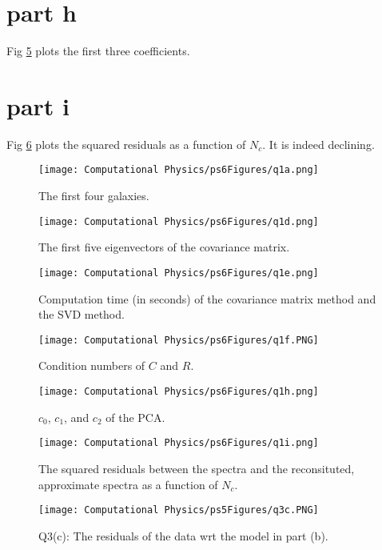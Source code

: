 \documentclass[11pt]{article}
\begin{document}
\section{part h}
Fig \ref{fig:Q1h} plots the first three coefficients.

\section{part i}
Fig \ref{fig:Q1i} plots the squared residuals as a function of $N_c$. It is indeed declining.

\begin{figure}[b!]
\centering
\texttt{[image: Computational Physics/ps6Figures/q1a.png]}
\caption{The first four galaxies.}
  \label{fig:Q1a}
\end{figure}

\begin{figure}[b!]
\centering
\texttt{[image: Computational Physics/ps6Figures/q1d.png]}
\caption{The first five eigenvectors of the covariance matrix.}
  \label{fig:Q1d}
\end{figure}

\begin{figure}[b!]
\centering
\texttt{[image: Computational Physics/ps6Figures/q1e.png]}
\caption{Computation time (in seconds) of the covariance matrix method and the SVD method.}
  \label{fig:Q1e}
\end{figure}

\begin{figure}[b!]
\centering
\texttt{[image: Computational Physics/ps6Figures/q1f.PNG]}
\caption{Condition numbers of $C$ and $R$.}
  \label{fig:Q1f}
\end{figure}

\begin{figure}[b!]
\centering
\texttt{[image: Computational Physics/ps6Figures/q1h.png]}
\caption{$c_0$, $c_1$, and $c_2$ of the PCA.}
  \label{fig:Q1h}
\end{figure}

\begin{figure}[b!]
\centering
\texttt{[image: Computational Physics/ps6Figures/q1i.png]}
\caption{The squared residuals between the spectra and the reconsituted, approximate spectra as a function of $N_c$.}
  \label{fig:Q1i}
\end{figure}

\begin{figure}[b!]
\centering
\texttt{[image: Computational Physics/ps5Figures/q3c.PNG]}
\caption{Q3(c): The residuals of the data wrt the model in part (b).}
  \label{fig:Q3c}
\end{figure}
\end{document}
